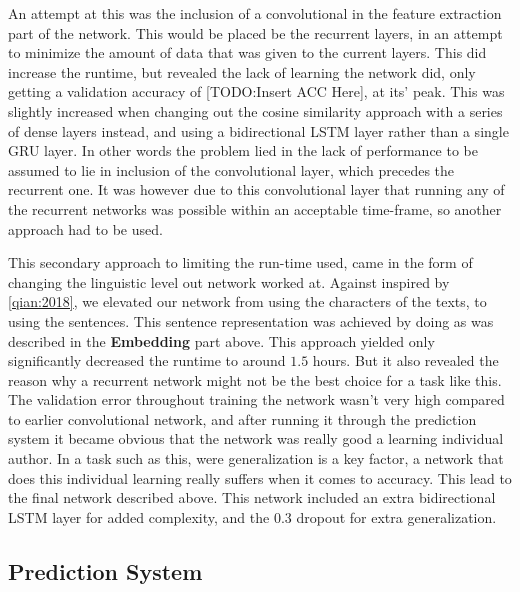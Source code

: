 An attempt at this was the inclusion of a convolutional in the feature
extraction part of the network. This would be placed be the recurrent layers, in
an attempt to minimize the amount of data that was given to the current layers.
This did increase the runtime, but revealed the lack of learning the network
did, only getting a validation accuracy of [TODO:Insert ACC Here], at its' peak.
This was slightly increased when changing out the cosine similarity approach
with a series of dense layers instead, and using a bidirectional \gls{LSTM}
layer rather than a single \gls{GRU} layer. In other words the problem lied in
the lack of performance to be assumed to lie in inclusion of the convolutional
layer, which precedes the recurrent one. It was however due to this convolutional
layer that running any of the recurrent networks was possible within an acceptable
time-frame, so another approach had to be used.

This secondary approach to limiting the run-time used, came in the form of
changing the linguistic level out network worked at. Against inspired by
\ref{qian:2018}, we elevated our network from using the characters of the texts,
to using the sentences. This sentence representation was achieved by doing as
was described in the \textbf{Embedding} part above. This approach yielded only
significantly decreased the runtime to around $1.5$ hours. But it also revealed
the reason why a recurrent network might not be the best choice for a task like
this. The validation error throughout training the network wasn't very high
compared to earlier convolutional network, and after running it through the
prediction system it became obvious that the network was really good a learning
individual author. In a task such as this, were generalization is a key factor,
a network that does this individual learning really suffers when it comes to
accuracy. This lead to the final network described above. This network included 
an extra bidirectional \gls{LSTM} layer for added complexity, and the 0.3
dropout for extra generalization.


\subsection{Prediction System}

